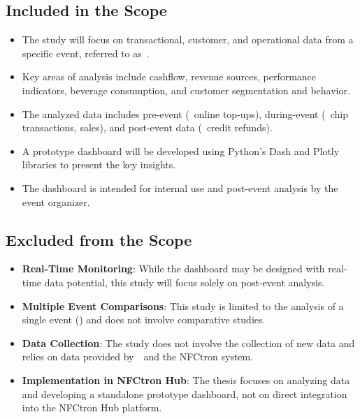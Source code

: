 \subsection*{Included in the Scope}
\label{subsec:introduction-scope-included}
\begin{itemize}
	\item The study will focus on transactional, customer, and operational data from a specific event, referred to as~\theEvent.
	\item Key areas of analysis include cashflow, revenue sources, performance indicators, beverage consumption, and customer segmentation and behavior.
	\item The analyzed data includes pre-event (\eg~online top-ups), during-event (\eg~chip transactions, sales), and post-event data (\eg~credit refunds).
	\item A prototype dashboard will be developed using Python’s Dash and Plotly libraries to present the key insights.
	\item The dashboard is intended for internal use and post-event analysis by the event organizer.
\end{itemize}

\subsection*{Excluded from the Scope}
\label{subsec:introduction-scope-excluded}
\begin{itemize}
	\item \textbf{Real-Time Monitoring}: While the dashboard may be designed with real-time data potential, this study will focus solely on post-event analysis.
	\item \textbf{Multiple Event Comparisons}: This study is limited to the analysis of a single event (\theEvent) and does not involve comparative studies.
	\item \textbf{Data Collection}: The study does not involve the collection of new data and relies on data provided by~\theOrganizer~and the NFCtron system.
	\item \textbf{Implementation in NFCtron Hub}: The thesis focuses on analyzing data and developing a standalone prototype dashboard, not on direct integration into the NFCtron Hub platform.
\end{itemize}

